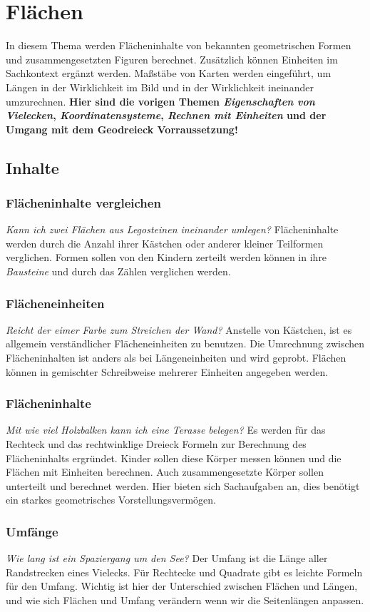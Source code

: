 \documentclass{article}
\begin{document}
\section{Flächen}
In diesem Thema werden Flächeninhalte von bekannten geometrischen Formen und zusammengesetzten Figuren berechnet. Zusätzlich können Einheiten im Sachkontext ergänzt werden. Maßstäbe von Karten werden eingeführt, um Längen in der Wirklichkeit im Bild und in der Wirklichkeit ineinander umzurechnen.
\textbf{Hier sind die vorigen Themen \textit{Eigenschaften von Vielecken}, \textit{Koordinatensysteme}, \textit{Rechnen mit Einheiten} und der Umgang mit dem Geodreieck Vorraussetzung!}
\subsection{Inhalte}
\subsubsection*{Flächeninhalte vergleichen}
\textit{Kann ich zwei Flächen aus Legosteinen ineinander umlegen?}
Flächeninhalte werden durch die Anzahl ihrer Kästchen oder anderer kleiner Teilformen verglichen. Formen sollen von den Kindern zerteilt werden können in ihre \textit{Bausteine} und durch das Zählen verglichen werden. 
\subsubsection*{Flächeneinheiten}
\textit{Reicht der eimer Farbe zum Streichen der Wand?}
Anstelle von Kästchen, ist es allgemein verständlicher Flächeneinheiten zu benutzen. Die Umrechnung zwischen Flächeninhalten ist anders als bei Längeneinheiten und wird geprobt. Flächen können in gemischter Schreibweise mehrerer Einheiten angegeben werden.
\subsubsection*{Flächeninhalte}
\textit{Mit wie viel Holzbalken kann ich eine Terasse belegen?}
Es werden für das Rechteck und das rechtwinklige Dreieck Formeln zur Berechnung des Flächeninhalts ergründet. Kinder sollen diese Körper messen können und die Flächen mit Einheiten berechnen. Auch zusammengesetzte Körper sollen unterteilt und berechnet werden.
Hier bieten sich Sachaufgaben an, dies benötigt ein starkes geometrisches Vorstellungsvermögen.
\subsubsection*{Umfänge}
\textit{Wie lang ist ein Spaziergang um den See?}
Der Umfang ist die Länge aller Randstrecken eines Vielecks. Für Rechtecke und Quadrate gibt es leichte Formeln für den Umfang. Wichtig ist hier der Unterschied zwischen Flächen und Längen, und wie sich Flächen und Umfang verändern wenn wir die Seitenlängen anpassen.
\end{document}
